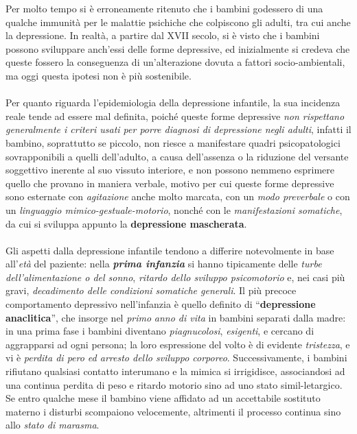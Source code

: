 Per molto tempo si è erroneamente ritenuto che i bambini godessero di
una qualche immunità per le malattie psichiche che colpiscono gli
adulti, tra cui anche la depressione. In realtà, a partire dal XVII
secolo, si è visto che i bambini possono sviluppare anch'essi delle
forme depressive, ed inizialmente si credeva che queste fossero la
conseguenza di un'alterazione dovuta a fattori socio-ambientali, ma oggi
questa ipotesi non è più sostenibile.
\\\\
Per quanto riguarda l'epidemiologia della depressione infantile, la sua
incidenza reale tende ad essere mal definita, poiché queste forme
depressive \emph{non rispettano generalmente i criteri usati per porre
diagnosi di depressione negli adulti}, infatti il bambino, soprattutto
se piccolo, non riesce a manifestare quadri psicopatologici
sovrapponibili a quelli dell'adulto, a causa dell'assenza o la riduzione
del versante soggettivo inerente al suo vissuto interiore, e non possono
nemmeno esprimere quello che provano in maniera verbale, motivo per cui
queste forme depressive sono esternate con \emph{agitazione} anche molto
marcata, con un \emph{modo preverbale} o con un \emph{linguaggio
mimico-gestuale-motorio}, nonché con le \emph{manifestazioni somatiche},
da cui si sviluppa appunto la \textbf{depressione mascherata}.
\\\\
Gli aspetti dalla depressione infantile tendono a differire notevolmente
in base all'\emph{età} del paziente: nella \textbf{\emph{prima
infanzia}} si hanno tipicamente delle \emph{turbe dell'alimentazione o
del sonno}, \emph{ritardo dello sviluppo psicomotorio} e, nei casi più
gravi, \emph{decadimento delle condizioni somatiche generali}. Il più
precoce comportamento depressivo nell'infanzia è quello definito di
``\textbf{depressione anaclitica}'', che insorge nel \emph{primo}
\emph{anno di vita} in bambini separati dalla madre: in una prima fase i
bambini diventano \emph{piagnucolosi}, \emph{esigenti}, e cercano di
aggrapparsi ad ogni persona; la loro espressione del volto è di evidente
\emph{tristezza}, e vi è \emph{perdita di pero ed arresto dello sviluppo
corporeo}. Successivamente, i bambini rifiutano qualsiasi contatto
interumano e la mimica si irrigidisce, associandosi ad una continua
perdita di peso e ritardo motorio sino ad uno stato simil-letargico. Se
entro qualche mese il bambino viene affidato ad un accettabile sostituto
materno i disturbi scompaiono velocemente, altrimenti il processo
continua sino allo \emph{stato di marasma}.

